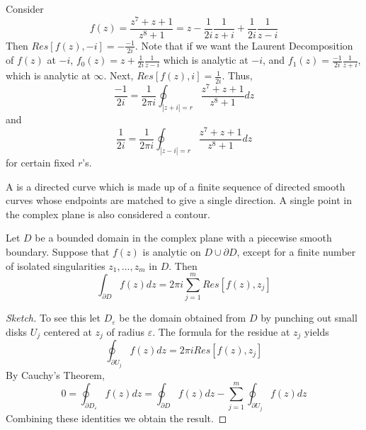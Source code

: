 \begin{example}
    Consider $$f(z) = \frac{z^7+z+1}{z^8+1} =z - \frac{1}{2i}\frac{1}{z+i}+\frac{1}{2i}\frac{1}{z-i}$$ Then $Res[f(z),-i] = -\frac{-1}{2i}$. Note that if we want the Laurent Decomposition of $f(z)$ at $-i$, $f_0(z) = z+\frac{1}{2i}\frac{1}{z-i}$ which is analytic at $-i$, and $f_1(z) = \frac{-1}{2i}\frac{1}{z+i}$, which is analytic at $\infty$. Next, $Res[f(z),i] = \frac{1}{2i}$. Thus, \begin{equation*}
        \frac{-1}{2i} = \frac{1}{2\pi i}\oint_{|z+i|=r}\frac{z^7+z+1}{z^8+1}dz 
    \end{equation*}
    and \begin{equation*}
        \frac{1}{2i} = \frac{1}{2\pi i}\oint_{|z-i|=r}\frac{z^7+z+1}{z^8+1}dz
    \end{equation*}
    for certain fixed $r$'s.
\end{example}

\begin{definition}
    A  is a directed curve which is made up of a finite sequence of directed smooth curves whose endpoints are matched to give a single direction. A single point in the complex plane is also considered a contour.
\end{definition}




\begin{theorem}
    Let $D$ be a bounded domain in the complex plane with a piecewise smooth boundary. Suppose that $f(z)$ is analytic on $D\cup \partial D$, except for a finite number of isolated singularities $z_1,...,z_m$ in $D$. Then \begin{equation*}
        \int_{\partial D}f(z)dz = 2\pi i\sum_{j=1}^mRes[f(z),z_j]
    \end{equation*}
\end{theorem}
\begin{proof}[Sketch]
    To see this let $D_{\varepsilon}$ be the domain obtained from $D$ by punching out small disks $U_j$ centered at $z_j$ of radius $\varepsilon$. The formula for the residue at $z_j$ yields \begin{equation*}
        \oint_{\partial U_j}f(z)dz = 2\pi iRes[f(z),z_j]
    \end{equation*}
    By Cauchy's Theorem, \begin{equation*}
        0 = \oint_{\partial D_{\varepsilon}}f(z)dz = \oint_{\partial D}f(z)dz - \sum_{j=1}^{m}\oint_{\partial U_j}f(z)dz
    \end{equation*}
    Combining these identities we obtain the result.
\end{proof}


